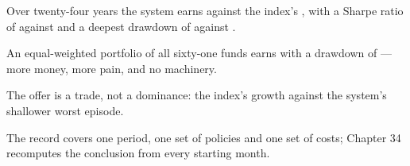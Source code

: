 \begin{keytakeaways}
\item Over twenty-four years the system earns \numFullCAGR{} against the
index's \numSpyCAGR{}, with a Sharpe ratio of \numFullSharpe{} against
\numSpySharpe{} and a deepest drawdown of \numFullDD{} against \numSpyDD{}.
\item An equal-weighted portfolio of all sixty-one funds earns
\numEqualCAGR{} with a drawdown of \numEqualDD{} --- more money, more
pain, and no machinery.
\item The offer is a trade, not a dominance: the index's growth against
the system's shallower worst episode.
\item The record covers one period, one set of policies and one set of
costs; Chapter 34 recomputes the conclusion from every starting month.
\end{keytakeaways}
